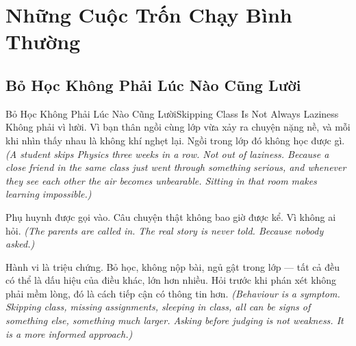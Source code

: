 
\chapter{Những Cuộc Trốn Chạy Bình Thường}

\section{Bỏ Học Không Phải Lúc Nào Cũng Lười}
\begin{truyen}{Bỏ Học Không Phải Lúc Nào Cũng Lười}{Skipping Class Is Not Always Laziness}
 Không phải vì lười. Vì bạn thân ngồi cùng lớp vừa xảy ra chuyện nặng nề, và mỗi khi nhìn thấy nhau là không khí nghẹt lại. Ngồi trong lớp đó không học được gì.
\textit{(A student skips Physics three weeks in a row. Not out of laziness. Because a close friend in the same class just went through something serious, and whenever they see each other the air becomes unbearable. Sitting in that room makes learning impossible.)}


Phụ huynh được gọi vào. Câu chuyện thật không bao giờ được kể. Vì không ai hỏi.
\textit{(The parents are called in. The real story is never told. Because nobody asked.)}

\begin{baihoc}
Hành vi là triệu chứng. Bỏ học, không nộp bài, ngủ gật trong lớp --- tất cả đều có thể là dấu hiệu của điều khác, lớn hơn nhiều. Hỏi trước khi phán xét không phải mềm lòng, đó là cách tiếp cận có thông tin hơn.
\textit{(Behaviour is a symptom. Skipping class, missing assignments, sleeping in class, all can be signs of something else, something much larger. Asking before judging is not weakness. It is a more informed approach.)}
\end{baihoc}
\end{truyen}

